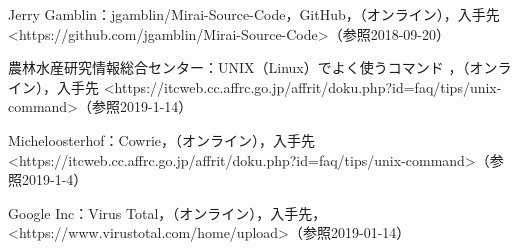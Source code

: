 \begin{thebibliography}{30}
        Jerry Gamblin：jgamblin/Mirai-Source-Code，GitHub，（オンライン），入手先\textless https://github.com/jgamblin/Mirai-Source-Code\textgreater（参照2018-09-20）
    
       農林水産研究情報総合センター：UNIX（Linux）でよく使うコマンド ，（オンライン），入手先 \textless https:\slash\slash{}itcweb.cc.affrc.go.jp\slash{}affrit/doku.php?id=faq\slash{}tips\slash{}unix-command\textgreater（参照2019-1-14）
    
        Micheloosterhof：Cowrie，（オンライン），入手先 \textless https:\slash\slash{}itcweb.cc.affrc.go.jp\slash{}affrit\slash{}doku.php?id=faq\slash{}tips/unix-command\textgreater（参照2019-1-4）
    
        Google Inc：Virus Total，（オンライン），入手先，\textless https:\slash\slash{}www.virustotal.com\slash{}home\slash{}upload\textgreater（参照2019-01-14）
\end{thebibliography}
